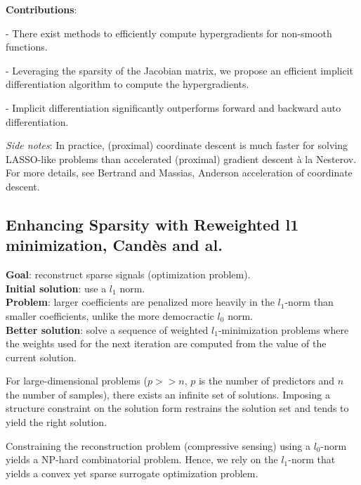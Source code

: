 \documentclass[a4paper,10pt]{article}
\theoremstyle{definition}
\begin{document}
\textbf{Contributions}:
\begin{list}{}{}
    \item - There exist methods to efficiently compute hypergradients for non-smooth functions.
    \item - Leveraging the sparsity of the Jacobian matrix, we propose an efficient implicit differentiation algorithm to compute the hypergradients.
    \item - Implicit differentiation significantly outperforms forward and backward auto differentiation. 
\end{list}

\vskip 0.1in

\textit{Side notes}: In practice, (proximal) coordinate descent is much faster for solving LASSO-like problems than accelerated (proximal) gradient descent à la Nesterov.
For more details, see Bertrand and Massias, Anderson acceleration of coordinate descent.

\subsection{Enhancing Sparsity with Reweighted l1 minimization, Candès and al.}

\textbf{Goal}: reconstruct sparse signals (optimization problem). \\
\textbf{Initial solution}: use a $l_1$ norm. \\
\textbf{Problem}: larger coefficients are penalized more heavily in the $l_1$-norm than smaller coefficients, unlike the more democractic $l_0$ norm. \\
\textbf{Better solution}: solve a sequence of weighted $l_1$-minimization problems where the weights used for the next iteration are computed from the value of the current solution.

\vskip 0.1in

For large-dimensional problems ($p >> n$, $p$ is the number of predictors and $n$ the number of samples), there exists an infinite set of solutions. Imposing a structure constraint on 
the solution form restrains the solution set and tends to yield the right solution.

\vskip 0.1in

Constraining the reconstruction problem (compressive sensing) using a $l_0$-norm yields a NP-hard combinatorial problem. Hence, we rely on the $l_1$-norm that yields a convex yet sparse surrogate optimization
problem. 

\vskip 0.1in
\end{document}
